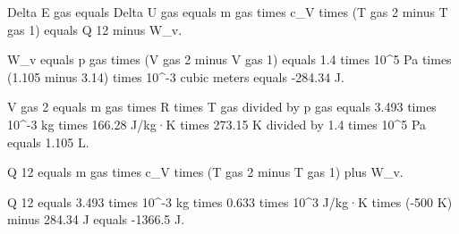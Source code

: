 Delta E gas equals Delta U gas equals m gas times c_V times (T gas 2 minus T gas 1) equals Q 12 minus W_v.  

W_v equals p gas times (V gas 2 minus V gas 1) equals 1.4 times 10^5 Pa times (1.105 minus 3.14) times 10^-3 cubic meters equals -284.34 J.  

V gas 2 equals m gas times R times T gas divided by p gas equals 3.493 times 10^-3 kg times 166.28 J/kg·K times 273.15 K divided by 1.4 times 10^5 Pa equals 1.105 L.  

Q 12 equals m gas times c_V times (T gas 2 minus T gas 1) plus W_v.  

Q 12 equals 3.493 times 10^-3 kg times 0.633 times 10^3 J/kg·K times (-500 K) minus 284.34 J equals -1366.5 J.